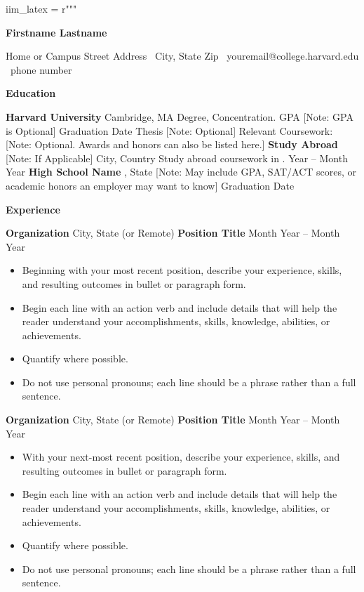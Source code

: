 iim_latex = r"""\documentclass[11pt]{article}
\begin{document}
\begin{center} \textbf{Firstname Lastname}\\ \hrulefill \end{center}
\begin{center} Home or Campus Street Address \textbullet \ City, State Zip \textbullet \ youremail@college.harvard.edu \textbullet \ phone number \end{center}
\vspace{0.5pt}
\begin{center} \textbf{Education} \end{center}
\textbf{Harvard University} \hfill Cambridge, MA Degree, Concentration. GPA [Note: GPA is Optional] \hfill Graduation Date Thesis [Note: Optional] Relevant Coursework: [Note: Optional. Awards and honors can also be listed here.]
\vspace{12pt} \textbf{Study Abroad} [Note: If Applicable] \hfill City, Country Study abroad coursework in   . \hfill\tMonth Year – Month Year
\vspace{12pt} \textbf{High School Name} \hfill\tCity, State [Note: May include GPA, SAT/ACT scores, or academic honors an employer may want to know] \hfill Graduation Date
\vspace{12pt} \begin{center} \textbf{Experience} \end{center}
\textbf{Organization} \hfill City, State (or Remote) \textbf{Position Title} \hfill Month Year – Month Year
\begin{itemize}[noitemsep, topsep=0pt, partopsep=0pt, parsep=0pt] \item Beginning with your most recent position, describe your experience, skills, and resulting outcomes in bullet or paragraph form. \item Begin each line with an action verb and include details that will help the reader understand your accomplishments, skills, knowledge, abilities, or achievements. \item Quantify where possible. \item Do not use personal pronouns; each line should be a phrase rather than a full sentence. \end{itemize}
\vspace{12pt} \textbf{Organization} \hfill City, State (or Remote) \textbf{Position Title} \hfill Month Year – Month Year
\begin{itemize}[noitemsep, topsep=0pt, partopsep=0pt, parsep=0pt] \item With your next-most recent position, describe your experience, skills, and resulting outcomes in bullet or paragraph form. \item Begin each line with an action verb and include details that will help the reader understand your accomplishments, skills, knowledge, abilities, or achievements. \item Quantify where possible. \item Do not use personal pronouns; each line should be a phrase rather than a full sentence. \end{itemize}
\end{document}
